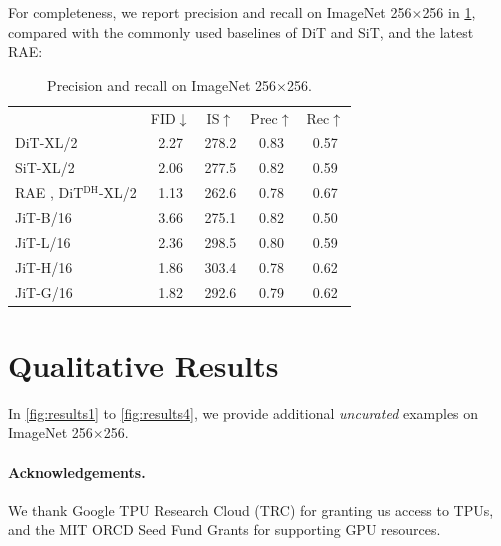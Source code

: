 For completeness, we report precision and recall \cite{Kynkaanniemi2019} on ImageNet 256$\times$256 in \cref{tab:prec-recall}, compared with the commonly used baselines of DiT and SiT, and the latest RAE:

\begin{table}[h]
\vspace{-.5em}
\begin{tabular}{l | c | c | c c }
 & FID$\downarrow$ & IS$\uparrow$ & Prec$\uparrow$ & Rec$\uparrow$ \\
\shline
DiT-XL/2 \cite{Peebles2023} & 2.27 & 278.2 & 0.83 & 0.57 \\
SiT-XL/2 \cite{ma2024sit} & 2.06 & 277.5 & 0.82 & 0.59 \\
RAE \cite{zheng2025diffusion}, DiT$^{\text{DH}}$-XL/2 & 1.13 & 262.6 & 0.78 & 0.67 \\
\hline
JiT-B/16 & 3.66 & 275.1 & 0.82 & 0.50 \\
JiT-L/16 & 2.36 & 298.5 & 0.80 & 0.59 \\
JiT-H/16 & 1.86 & 303.4 & 0.78 & 0.62 \\
JiT-G/16 & 1.82 & 292.6 & 0.79 & 0.62 \\
\end{tabular}
\vspace{-.5em}
\caption{Precision and recall on ImageNet 256$\times$256.}
\label{tab:prec-recall}
\vspace{-.5em}
\end{table}

\section{Qualitative Results}

In \cref{fig:results1} to \ref{fig:results4}, we provide additional \textit{uncurated} examples on ImageNet 256$\times$256.


\newpage

\vspace{1em}
\paragraph{Acknowledgements.} 
We thank Google TPU Research Cloud (TRC) for granting us access to TPUs, and the MIT ORCD Seed Fund Grants for supporting GPU resources.
